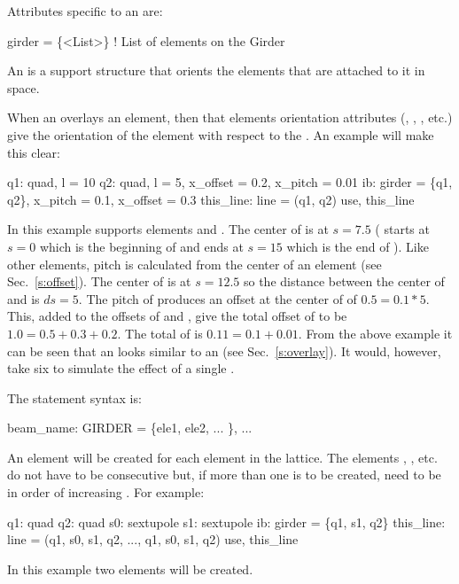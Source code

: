 Attributes specific to an  are:
\begin{example}
  girder = \{<List>\}   ! List of elements on the Girder
\end{example}

An  is a support structure that orients the elements that
are attached to it in space.

When an  overlays an element, then that elements
orientation attributes (, , , etc.) 
give the orientation of
the element with respect to the . An example will make this clear:
\begin{example}
  q1: quad, l = 10
  q2: quad, l = 5, x_offset = 0.2, x_pitch = 0.01
  ib: girder = \{q1, q2\}, x_pitch = 0.1, x_offset = 0.3
  this_line: line = (q1, q2)
  use, this_line
\end{example}
In this example  supports elements  and . The
center of  is at $s = 7.5$ ( starts at $s = 0$ which is
the beginning of  and ends at $s = 15$ which is the end of
). Like other elements, pitch is calculated from the center of
an  element (see Sec.~\ref{s:offset}). The center of
 is at $s = 12.5$ so the distance between the center of 
and  is $ds = 5$. The pitch of  produces an offset at
the center of  of $0.5 = 0.1 * 5$. This, added to the offsets
of  and , give the total offset of  to be $1.0 =
0.5 + 0.3 + 0.2$. The total  of  is $0.11 = 0.1 +
0.01$. From the above example it can be seen that an  looks
similar to an  (see Sec.~\ref{s:overlay}). It would,
however, take six  to simulate the effect of a single
.

The  statement syntax is:
\begin{example}
  beam_name: GIRDER = \{ele1, ele2, ... \}, ...
\end{example}
An  element will be created for each  element in
the lattice. The elements , , etc. do not have to be
consecutive but, if more than one  is to be created, need
to be in order of increasing .
For example:
\begin{example}
  q1: quad
  q2: quad
  s0: sextupole
  s1: sextupole
  ib: girder = \{q1, s1, q2\}
  this_line: line = (q1, s0, s1, q2, ..., q1, s0, s1, q2)
  use, this_line
\end{example}
In this example two  elements will be created.

